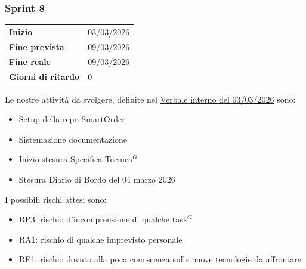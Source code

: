 \subsubsection{Sprint 8}


\begin{tabular}{p{} p{}}
	\textbf{Inizio} & 03/03/2026 \\
	\textbf{Fine prevista} & 09/03/2026 \\
	\textbf{Fine reale} & 09/03/2026 \\
	\textbf{Giorni di ritardo} & 0
\end{tabular}
\newline \newline 
Le nostre attività da svolgere, definite nel \href{https://nullpointersgroup.github.io/Documentazione/output/PB/Verbali%20Interni/2026-03-03_verbale_interno.pdf}{Verbale interno del 03/03/2026} sono:
\begin{itemize}[itemsep=5pt, parsep=1pt, label=$\scriptstyle\bullet$]
    \item Setup della repo SmartOrder
    \item Sistemazione documentazione
    \item Inizio stesura Specifica Tecnica$^G$
    \item Stesura Diario di Bordo del 04 marzo 2026
\end{itemize}

I possibili rischi attesi sono:
\begin{itemize}[itemsep=5pt, parsep=1pt, label=$\scriptstyle\bullet$]
	\item RP3: rischio d'incomprensione di qualche task$^G$
	\item RA1: rischio di qualche imprevisto personale
	\item RE1: rischio dovuto alla poca conoscenza sulle nuove tecnologie da affrontare
\end{itemize}

